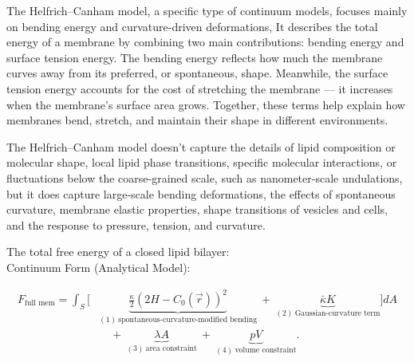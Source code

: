 \documentclass[12pt]{article}
\begin{document}
\begin{flushleft}
The Helfrich–Canham model, a specific type of continuum models, focuses mainly on bending energy and curvature-driven deformations, It describes the total energy of a membrane by combining two main contributions: bending energy and surface tension energy. The bending energy reflects how much the membrane curves away from its preferred, or spontaneous, shape. Meanwhile, the surface tension energy accounts for the cost of stretching the membrane — it increases when the membrane's surface area grows. Together, these terms help explain how membranes bend, stretch, and maintain their shape in different environments.

The Helfrich–Canham model doesn't capture the details of lipid composition or molecular shape, local lipid phase transitions, specific molecular interactions, or fluctuations below the coarse-grained scale, such as nanometer-scale undulations, but it does capture large-scale bending deformations, the effects of spontaneous curvature, membrane elastic properties, shape transitions of vesicles and cells, and the response to pressure, tension, and curvature.


The total free energy of a closed lipid bilayer:\\
Continuum Form (Analytical Model):
\vspace{-1em}


\begin{align}
F_\text{full mem} = \int_S \Bigg[
&\underbrace{\frac{\kappa}{2} \left(2H - C_0(\vec{r}) \right)^2}_{(1)\ \text{spontaneous-curvature-modified bending}} 
\ + \ 
\underbrace{\bar{\kappa} K}_{(2)\ \text{Gaussian-curvature term}} 
\Bigg] dA \nonumber \\
&\quad + \ 
\underbrace{\lambda A}_{(3)\ \text{area constraint}} 
\ + \ 
\underbrace{p V}_{(4)\ \text{volume constraint}}.
\end{align}





\end{flushleft}
\end{document}
